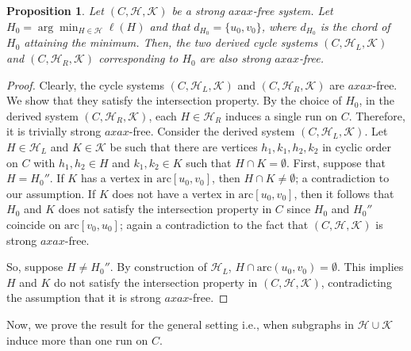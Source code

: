\documentclass[12pt]{article}
\newcommand{\HH}{\mathcal{H}}
\newcommand{\KK}{\mathcal{K}}
\newcommand{\arc}{\mathrm{arc}}
\newtheorem{proposition}[theorem]{Proposition}
\theoremstyle{case}
\begin{document}
\begin{proposition}
\label{prop:propp}
Let $(C,\mathcal{H},\mathcal{K})$ be a strong $axax$-free system.
Let $H_0=\arg\min_{H\in\mathcal{H}}\ell(H)$ and that $d_{H_0}=\{u_0,v_0\}$, where $d_{H_0}$ is the chord of $H_0$ attaining 
the minimum. Then, the two derived cycle systems $(C,\mathcal{H}_L,\mathcal{K})$ and
$(C, \mathcal{H}_R, \mathcal{K})$ corresponding
to $H_0$ are also strong $axax$-free.
\end{proposition}
\begin{proof}
Clearly, the cycle systems $(C,\HH_L,\KK)$ and $(C,\HH_R,\KK)$ are $axax$-free.
We show that they satisfy the intersection property.
By the choice of $H_0$, in the derived system $(C,\mathcal{H}_R,\mathcal{K})$, each $H\in\mathcal{H}_R$
induces a single run on $C$. Therefore, it is trivially strong $axax$-free.
Consider the derived system $(C,\HH_L,\KK)$. Let $H\in\mathcal{H}_L$ and $K\in\mathcal{K}$ be such that there are vertices
$h_1, k_1, h_2, k_2$ in cyclic order on $C$ with $h_1,h_2\in H$ and $k_1,k_2\in K$ such that $H\cap K=\emptyset$.
First, suppose that $H=H_0''$. If $K$ has a vertex in $\arc[u_0,v_0]$, then $H\cap K\ne\emptyset$; a contradiction to our assumption.
If $K$ does not have a vertex in $\arc[u_0,v_0]$, then it follows that $H_0$ and $K$ does not satisfy the intersection property in $C$ since $H_0$ and $H_0''$ coincide on $\arc[v_0,u_0]$; again a contradiction to the fact that $(C,\HH,\KK)$ is strong $axax$-free.

So, suppose $H\ne H_0''$.
By construction of $\mathcal{H}_L$, $H\cap \arc(u_0, v_0)=\emptyset$.
This implies $H$ and $K$ do not satisfy the intersection property
in $(C,\mathcal{H},\mathcal{K})$, contradicting the assumption that
it is strong $axax$-free.
\end{proof}

Now, we prove the result for the general setting i.e., when subgraphs in $\HH\cup\KK$ induce more than one run
on $C$.
\end{document}

